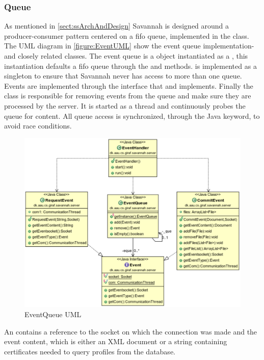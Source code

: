 \subsubsection{Queue}

As mentioned in \autoref{sect:ssArchAndDesign} Savannah is designed around a producer-consumer pattern centered on a fifo queue, implemented in the  class.
The UML diagram in \autoref{figure:EventUML} show the event queue implementation- and closely related classes.
The event queue is a  object instantiated as a , this instantiation defaults a fifo queue through
the  and  methods.  is implemented as a singleton to ensure that Savannah never has access to more than one queue.
Events are implemented through the  interface that  and  implements.
Finally the  class is responsible for removing events from the queue and make sure they are processed by the server. It is started as a thread and
continuously probes the queue for content. All queue access is synchronized, through the Java  keyword, to avoid race conditions.

\begin{figure}[H]
 \centering
  \includegraphics[scale=0.65]{images/EventQueue}
  \caption{EventQueue UML}
  \label{figure:EventUML}
\end{figure}

An  contains a reference to the socket on which the connection was made and the event content, which is either an XML document or a string containing certificates
needed to query profiles from the database.
